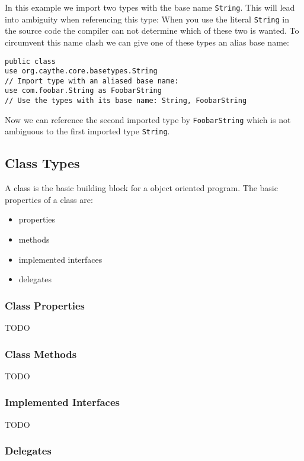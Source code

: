 \documentclass[11pt,a4paper]{report}
\begin{document}
In this example we import two types with the base name \texttt{String}. This will lead into ambiguity when referencing this type: When you use the literal \texttt{String} in the source code the compiler can not determine which of these two is wanted. To circumvent this name clash we can give one of these types an alias base name:

\begin{lstlisting}[language=CayThe, title=Module source file foo/bar/Baz.ct]
public class
use org.caythe.core.basetypes.String
// Import type with an aliased base name:
use com.foobar.String as FoobarString
// Use the types with its base name: String, FoobarString
\end{lstlisting}

Now we can reference the second imported type by \texttt{FoobarString} which is not ambiguous to the first imported type \texttt{String}.

\subsection{Class Types}

A class is the basic building block for a object oriented program. The basic properties of a class are:

\begin{itemize}
    \item properties
    \item methods
    \item implemented interfaces
    \item delegates
\end{itemize}

\subsubsection{Class Properties}

TODO

\subsubsection{Class Methods}

TODO

\subsubsection{Implemented Interfaces}

TODO

\subsubsection{Delegates}
\end{document}
